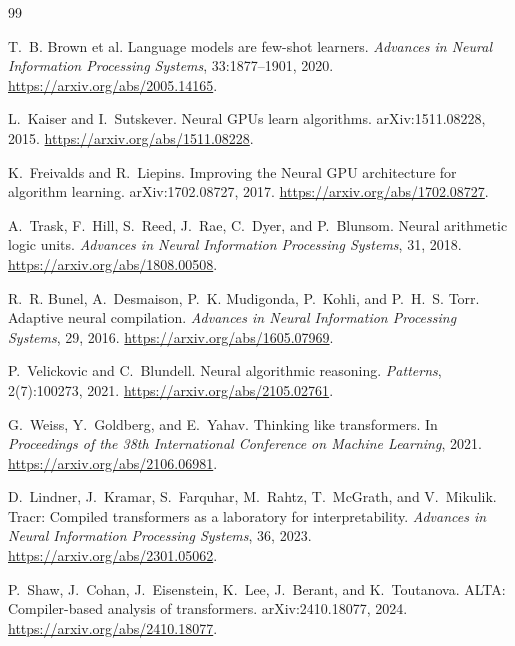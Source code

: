 \documentclass[11pt]{article}
\begin{document}
\begin{thebibliography}{99}

T.~B. Brown et al.
\newblock Language models are few-shot learners.
\newblock \emph{Advances in Neural Information Processing Systems},
33:1877--1901, 2020.
\newblock \url{https://arxiv.org/abs/2005.14165}.

L.~Kaiser and I.~Sutskever.
\newblock Neural GPUs learn algorithms.
\newblock arXiv:1511.08228, 2015.
\newblock \url{https://arxiv.org/abs/1511.08228}.

K.~Freivalds and R.~Liepins.
\newblock Improving the Neural GPU architecture for algorithm learning.
\newblock arXiv:1702.08727, 2017.
\newblock \url{https://arxiv.org/abs/1702.08727}.

A.~Trask, F.~Hill, S.~Reed, J.~Rae, C.~Dyer, and P.~Blunsom.
\newblock Neural arithmetic logic units.
\newblock \emph{Advances in Neural Information Processing Systems}, 31, 2018.
\newblock \url{https://arxiv.org/abs/1808.00508}.

R.~R. Bunel, A.~Desmaison, P.~K. Mudigonda, P.~Kohli, and P.~H.~S. Torr.
\newblock Adaptive neural compilation.
\newblock \emph{Advances in Neural Information Processing Systems}, 29, 2016.
\newblock \url{https://arxiv.org/abs/1605.07969}.

P.~Velickovic and C.~Blundell.
\newblock Neural algorithmic reasoning.
\newblock \emph{Patterns}, 2(7):100273, 2021.
\newblock \url{https://arxiv.org/abs/2105.02761}.

G.~Weiss, Y.~Goldberg, and E.~Yahav.
\newblock Thinking like transformers.
\newblock In \emph{Proceedings of the 38th International Conference on Machine
Learning}, 2021.
\newblock \url{https://arxiv.org/abs/2106.06981}.

D.~Lindner, J.~Kramar, S.~Farquhar, M.~Rahtz, T.~McGrath, and V.~Mikulik.
\newblock Tracr: Compiled transformers as a laboratory for interpretability.
\newblock \emph{Advances in Neural Information Processing Systems}, 36, 2023.
\newblock \url{https://arxiv.org/abs/2301.05062}.

P.~Shaw, J.~Cohan, J.~Eisenstein, K.~Lee, J.~Berant, and K.~Toutanova.
\newblock ALTA: Compiler-based analysis of transformers.
\newblock arXiv:2410.18077, 2024.
\newblock \url{https://arxiv.org/abs/2410.18077}.


\end{thebibliography}
\end{document}
